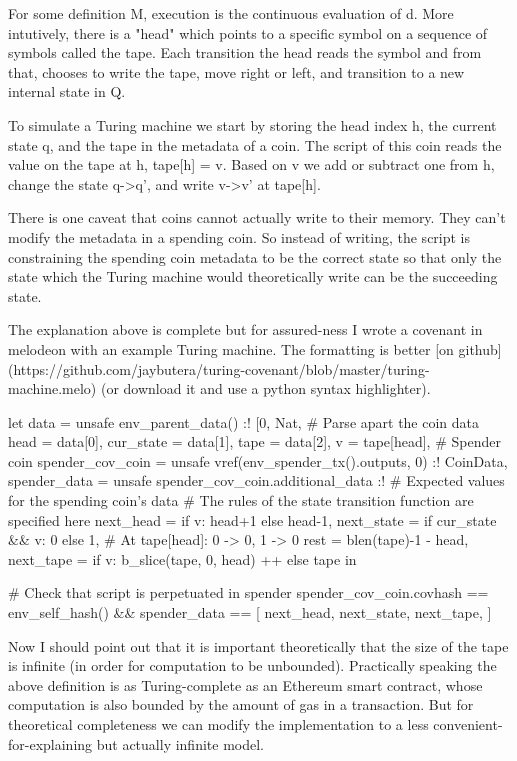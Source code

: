 For some definition M, execution is the continuous evaluation of d. More intutively, there is a "head" which points to a specific symbol on a sequence of symbols called the tape. Each transition the head reads the symbol and from that, chooses to write the tape, move right or left, and transition to a new internal state in Q.




To simulate a Turing machine we start by storing the head index h, the current state q, and the tape in the metadata of a coin. The script of this coin reads the value on the tape at h, tape[h] = v. Based on v we add or subtract one from h, change the state q->q', and write v->v' at tape[h].

There is one caveat that coins cannot actually write to their memory. They can't modify the metadata in a spending coin. So instead of writing, the script is constraining the spending coin metadata to be the correct state so that only the state which the Turing machine would theoretically write can be the succeeding state.

The explanation above is complete but for assured-ness I wrote a covenant in melodeon with an example Turing machine. The formatting is better [on github](https://github.com/jaybutera/turing-covenant/blob/master/turing-machine.melo) (or download it and use a python syntax highlighter).


let data = unsafe env_parent_data() :! [{0}, Nat, %
    # Parse apart the coin data
    head = data[0],
    cur_state = data[1],
    tape = data[2],
    v = tape[head],
    # Spender coin
    spender_cov_coin = unsafe vref(env_spender_tx().outputs, 0) :! CoinData,
    spender_data = unsafe spender_cov_coin.additional_data :! %
    # Expected values for the spending coin's data
    # The rules of the state transition function are specified here
    next_head = if v: head+1 else head-1,
    next_state = if cur_state && v: 0 else 1,
    # At tape[head]: 0 -> 0, 1 -> 0
    rest = blen(tape)-1 - head,
    next_tape =
        if v: b_slice(tape, 0, head) ++ %
        else tape in

    # Check that script is perpetuated in spender
    spender_cov_coin.covhash == env_self_hash()
    && spender_data == [
        next_head,
        next_state,
        next_tape,
    ]







Now I should point out that it is important theoretically that the size of the tape is infinite (in order for computation to be unbounded). Practically speaking the above definition is as Turing-complete as an Ethereum smart contract, whose computation is also bounded by the amount of gas in a transaction. But for theoretical completeness we can modify the implementation to a less convenient-for-explaining but actually infinite model.

